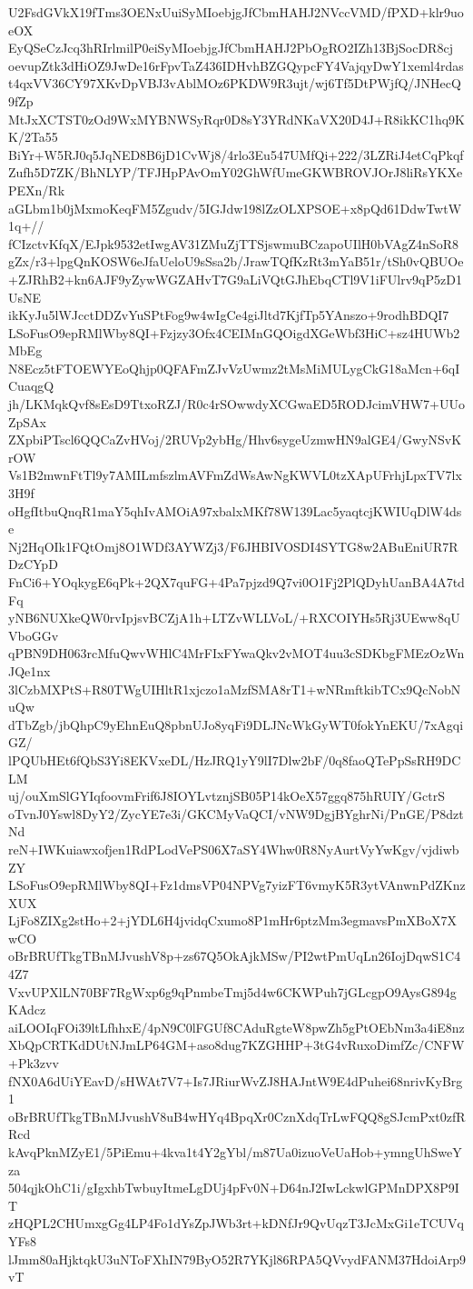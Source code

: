 U2FsdGVkX19fTms3OENxUuiSyMIoebjgJfCbmHAHJ2NVccVMD/fPXD+klr9uoeOX
EyQSeCzJcq3hRIrlmilP0eiSyMIoebjgJfCbmHAHJ2PbOgRO2IZh13BjSocDR8cj
oevupZtk3dHiOZ9JwDe16rFpvTaZ436IDHvhBZGQypcFY4VajqyDwY1xeml4rdas
t4qxVV36CY97XKvDpVBJ3vAblMOz6PKDW9R3ujt/wj6Tf5DtPWjfQ/JNHecQ9fZp
MtJxXCTST0zOd9WxMYBNWSyRqr0D8sY3YRdNKaVX20D4J+R8ikKC1hq9KK/2Ta55
BiYr+W5RJ0q5JqNED8B6jD1CvWj8/4rlo3Eu547UMfQi+222/3LZRiJ4etCqPkqf
Zufh5D7ZK/BhNLYP/TFJHpPAvOmY02GhWfUmeGKWBROVJOrJ8liRsYKXePEXn/Rk
aGLbm1b0jMxmoKeqFM5Zgudv/5IGJdw198lZzOLXPSOE+x8pQd61DdwTwtW1q+//
fCIzctvKfqX/EJpk9532etIwgAV31ZMuZjTTSjswmuBCzapoUIlH0bVAgZ4nSoR8
gZx/r3+lpgQnKOSW6eJfaUeloU9sSsa2b/JrawTQfKzRt3mYaB51r/tSh0vQBUOe
+ZJRhB2+kn6AJF9yZywWGZAHvT7G9aLiVQtGJhEbqCTl9V1iFUlrv9qP5zD1UsNE
ikKyJu5lWJcctDDZvYuSPtFog9w4wIgCe4giJltd7KjfTp5YAnszo+9rodhBDQI7
LSoFusO9epRMlWby8QI+Fzjzy3Ofx4CEIMnGQOigdXGeWbf3HiC+sz4HUWb2MbEg
N8Ecz5tFTOEWYEoQhjp0QFAFmZJvVzUwmz2tMsMiMULygCkG18aMcn+6qICuaqgQ
jh/LKMqkQvf8sEsD9TtxoRZJ/R0c4rSOwwdyXCGwaED5RODJcimVHW7+UUoZpSAx
ZXpbiPTscl6QQCaZvHVoj/2RUVp2ybHg/Hhv6sygeUzmwHN9alGE4/GwyNSvKrOW
Vs1B2mwnFtTl9y7AMILmfszlmAVFmZdWsAwNgKWVL0tzXApUFrhjLpxTV7lx3H9f
oHgfItbuQnqR1maY5qhIvAMOiA97xbalxMKf78W139Lac5yaqtcjKWIUqDlW4dse
Nj2HqOIk1FQtOmj8O1WDf3AYWZj3/F6JHBIVOSDI4SYTG8w2ABuEniUR7RDzCYpD
FnCi6+YOqkygE6qPk+2QX7quFG+4Pa7pjzd9Q7vi0O1Fj2PlQDyhUanBA4A7tdFq
yNB6NUXkeQW0rvIpjsvBCZjA1h+LTZvWLLVoL/+RXCOIYHs5Rj3UEww8qUVboGGv
qPBN9DH063rcMfuQwvWHlC4MrFIxFYwaQkv2vMOT4uu3cSDKbgFMEzOzWnJQe1nx
3lCzbMXPtS+R80TWgUIHltR1xjczo1aMzfSMA8rT1+wNRmftkibTCx9QcNobNuQw
dTbZgb/jbQhpC9yEhnEuQ8pbnUJo8yqFi9DLJNcWkGyWT0fokYnEKU/7xAgqiGZ/
lPQUbHEt6fQbS3Yi8EKVxeDL/HzJRQ1yY9lI7Dlw2bF/0q8faoQTePpSsRH9DCLM
uj/ouXmSlGYIqfoovmFrif6J8IOYLvtznjSB05P14kOeX57ggq875hRUIY/GctrS
oTvnJ0Yswl8DyY2/ZycYE7e3i/GKCMyVaQCI/vNW9DgjBYghrNi/PnGE/P8dztNd
reN+IWKuiawxofjen1RdPLodVePS06X7aSY4Whw0R8NyAurtVyYwKgv/vjdiwbZY
LSoFusO9epRMlWby8QI+Fz1dmsVP04NPVg7yizFT6vmyK5R3ytVAnwnPdZKnzXUX
LjFo8ZIXg2stHo+2+jYDL6H4jvidqCxumo8P1mHr6ptzMm3egmavsPmXBoX7XwCO
oBrBRUfTkgTBnMJvushV8p+zs67Q5OkAjkMSw/PI2wtPmUqLn26IojDqwS1C44Z7
VxvUPXlLN70BF7RgWxp6g9qPnmbeTmj5d4w6CKWPuh7jGLcgpO9AysG894gKAdcz
aiLOOIqFOi39ltLfhhxE/4pN9C0lFGUf8CAduRgteW8pwZh5gPtOEbNm3a4iE8nz
XbQpCRTKdDUtNJmLP64GM+aso8dug7KZGHHP+3tG4vRuxoDimfZc/CNFW+Pk3zvv
fNX0A6dUiYEavD/sHWAt7V7+Is7JRiurWvZJ8HAJntW9E4dPuhei68nrivKyBrg1
oBrBRUfTkgTBnMJvushV8uB4wHYq4BpqXr0CznXdqTrLwFQQ8gSJcmPxt0zfRRcd
kAvqPknMZyE1/5PiEmu+4kva1t4Y2gYbl/m87Ua0izuoVeUaHob+ymngUhSweYza
504qjkOhC1i/gIgxhbTwbuyItmeLgDUj4pFv0N+D64nJ2IwLckwlGPMnDPX8P9IT
zHQPL2CHUmxgGg4LP4Fo1dYsZpJWb3rt+kDNfJr9QvUqzT3JcMxGi1eTCUVqYFs8
lJmm80aHjktqkU3uNToFXhIN79ByO52R7YKjl86RPA5QVvydFANM37HdoiArp9vT
